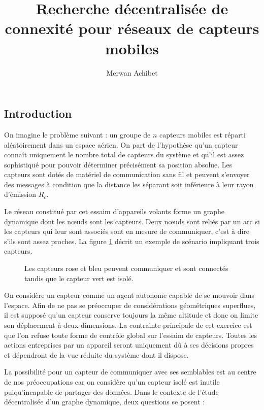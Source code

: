 \documentclass[10pt]{article}
\title{Recherche décentralisée de connexité pour réseaux de capteurs mobiles}
\author{Merwan Achibet}
\date{}
\begin{document}
\maketitle

\begin{multicols}{2}

\section{Introduction}

On imagine le problème suivant : un groupe de $n$ capteurs mobiles est
réparti aléatoirement dans un espace aérien. On part de l'hypothèse
qu'un capteur connaît uniquement le nombre total de capteurs du
système et qu'il est assez sophistiqué pour pouvoir déterminer
précisément sa position absolue. Les capteurs sont dotés de matériel
de communication sans fil et peuvent s'envoyer des messages à
condition que la distance les séparant soit inférieure à leur rayon
d'émission $R_c$.

Le réseau constitué par cet essaim d'appareils volants forme un graphe
dynamique dont les n\oe uds sont les capteurs. Deux n\oe uds sont
reliés par un arc si les capteurs qui leur sont associés sont en
mesure de communiquer, c'est à dire s'ils sont assez proches. La
figure \ref{communication} décrit un exemple de scénario impliquant
trois capteurs.

\begin{figure}[H]

  \centering

  

  \caption{Les capteurs rose et bleu peuvent communiquer et sont
    connectés tandis que le capteur vert est isolé.}
  \label{communication}

\end{figure}

On considère un capteur comme un agent autonome capable de se mouvoir
dans l'espace. Afin de ne pas se préoccuper de considérations
géométriques superflues, il est supposé qu'un capteur conserve
toujours la même altitude et donc on limite son déplacement à deux
dimensions. La contrainte principale de cet exercice est que l'on
refuse toute forme de contrôle global sur l'essaim de capteurs. Toutes
les actions entreprises par un appareil seront uniquement dû à ses
décisions propres et dépendront de la vue réduite du système dont il
dispose.

La possibilité pour un capteur de communiquer avec ses semblables est
au centre de nos préoccupations car on considère qu'un capteur isolé
est inutile puiqu'incapable de partager des données. Dans le contexte
de l'étude décentralisée d'un graphe dynamique, deux questions se
posent :


\end{multicols}
\end{document}

